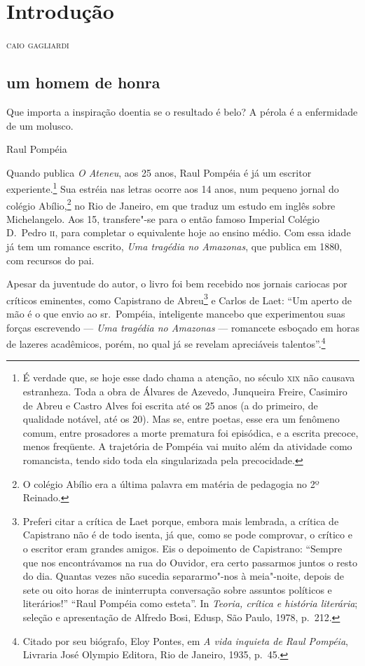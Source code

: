 \chapter[Introdução, \emph{por Caio Gagliardi}]{Introdução}

\begin{flushright}
\textsc{caio gagliardi}
\end{flushright}

\section*{um homem de honra}

\epigraph{Que importa a inspiração doentia se o resultado é belo? A pérola é a enfermidade de um molusco.}{Raul Pompéia}

Quando publica \textit{O
Ateneu}, aos 25 anos, Raul Pompéia é já um escritor
experiente.\footnote{ É verdade que, se hoje esse dado chama a
atenção, no século \textsc{xix} não causava estranheza. Toda a obra de Álvares
de Azevedo, Junqueira Freire, Casimiro de Abreu e Castro Alves foi
escrita até os 25 anos (a do primeiro, de qualidade notável, até os
20). Mas se, entre poetas, esse era um fenômeno comum, entre prosadores
a morte prematura foi episódica, e a escrita precoce, menos freqüente.
A trajetória de Pompéia vai muito além da atividade como romancista,
tendo sido toda ela singularizada pela precocidade.}
Sua estréia nas letras ocorre aos 14 anos, num pequeno jornal do
colégio Abílio,\footnote{O colégio Abílio era a
última palavra em matéria de pedagogia no 2º Reinado.} no Rio de Janeiro, 
em que traduz um estudo em inglês sobre
Michelangelo. Aos 15, transfere"-se para o então famoso Imperial
Colégio D.~Pedro \textsc{ii}, para completar o equivalente hoje ao ensino médio.
Com essa idade já tem um romance escrito, \textit{Uma
tragédia no Amazonas}, que publica em 1880, com recursos do pai.


Apesar da juventude do autor, o livro foi bem recebido
nos jornais cariocas por críticos eminentes, como Capistrano de
Abreu\footnote{ Preferi citar a crítica de Laet porque, embora mais
lembrada, a crítica de Capistrano não é de todo isenta, já que, como se
pode comprovar, o crítico e o escritor eram grandes amigos. Eis o
depoimento de Capistrano: ``Sempre que nos encontrávamos na rua do
Ouvidor, era certo passarmos juntos o resto do dia. Quantas vezes não
sucedia separarmo"-nos à meia"-noite, depois de sete ou oito horas de
ininterrupta conversação sobre assuntos políticos e literários!'' ``Raul
Pompéia como esteta''. In \textit{Teoria, crítica e história literária};
seleção e apresentação de Alfredo Bosi, Edusp, São Paulo, 1978, p.~212.}
e Carlos de Laet: ``Um aperto de mão é o que envio ao
sr.~Pompéia, inteligente mancebo que experimentou suas forças
escrevendo --- \textit{Uma tragédia no
Amazonas} --- romancete esboçado em horas de lazeres
acadêmicos, porém, no qual já se revelam apreciáveis
talentos''.\footnote{ Citado por seu biógrafo, Eloy Pontes, em
\textit{A vida inquieta de Raul Pompéia}, Livraria José
Olympio Editora, Rio de Janeiro, 1935, p.~45.}

